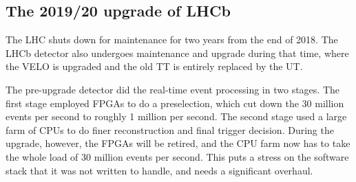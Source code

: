 \documentclass[12pt]{article}
\begin{document}
\subsection{The 2019/20 upgrade of LHCb}\label{sec_lhcb_upgrade}

The LHC shuts down for maintenance for two years from the end of 2018. The LHCb detector also undergoes maintenance and upgrade during that time, where the VELO is upgraded and the old TT is entirely replaced by the UT.

The pre-upgrade detector did the real-time event processing in two stages. The first stage employed FPGAs to do a preselection, which cut down the 30 million events per second to roughly 1 million per second. The second stage used a large farm of CPUs to do finer reconstruction and final trigger decision. During the upgrade, however, the FPGAs will be retired, and the CPU farm now has to take the whole load of 30 million events per second. This puts a stress on the software stack that it was not written to handle, and needs a significant overhaul.
\end{document}

